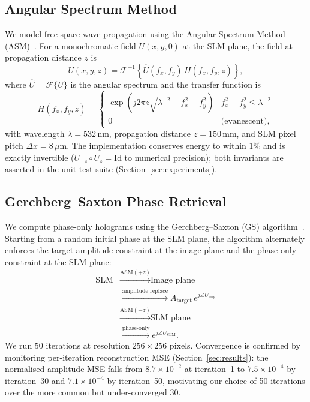 \documentclass[conference]{IEEEtran}
\begin{document}
\subsection{Angular Spectrum Method}
We model free-space wave propagation using the Angular Spectrum Method
(ASM)~\cite{goodman2005introduction}. For a monochromatic field $U(x,y,0)$ at the
SLM plane, the field at propagation distance $z$ is
\begin{equation}
  U(x,y,z) = \mathcal{F}^{-1}\!\left\{
    \hat{U}(f_x, f_y)\, H(f_x, f_y, z)
  \right\},
\end{equation}
where $\hat{U} = \mathcal{F}\{U\}$ is the angular spectrum and the transfer
function is
\begin{equation}
  H(f_x,f_y,z) =
  \begin{cases}
    \exp\!\left(j 2\pi z \sqrt{\lambda^{-2} - f_x^2 - f_y^2}\right) & f_x^2+f_y^2 \le \lambda^{-2}\\
    0 & \text{(evanescent),}
  \end{cases}
\end{equation}
with wavelength $\lambda = 532\,\text{nm}$, propagation distance
$z = 150\,\text{mm}$, and SLM pixel pitch $\Delta x = 8\,\mu\text{m}$. The
implementation conserves energy to within $1\%$ and is exactly invertible
($U_{-z} \circ U_{z} = \mathrm{Id}$ to numerical precision); both invariants are
asserted in the unit-test suite (Section~\ref{sec:experiments}).

\subsection{Gerchberg--Saxton Phase Retrieval}
We compute phase-only holograms using the Gerchberg--Saxton (GS)
algorithm~\cite{gerchberg1972practical}. Starting from a random initial phase at
the SLM plane, the algorithm alternately enforces the target amplitude constraint
at the image plane and the phase-only constraint at the SLM plane:
\begin{align}
  \text{SLM} &\xrightarrow{\text{ASM}(+z)} \text{Image plane} \\
  &\xrightarrow{\text{amplitude replace}} A_{\text{target}}\, e^{j\angle U_{\text{img}}} \\
  &\xrightarrow{\text{ASM}(-z)} \text{SLM plane} \\
  &\xrightarrow{\text{phase-only}} e^{j\angle U_{\text{SLM}}}.
\end{align}
We run $50$ iterations at resolution $256\times256$ pixels. Convergence is
confirmed by monitoring per-iteration reconstruction MSE
(Section~\ref{sec:results}): the normalised-amplitude MSE falls from
$8.7\times10^{-2}$ at iteration~1 to $7.5\times10^{-4}$ by iteration~30 and
$7.1\times10^{-4}$ by iteration~50, motivating our choice of 50 iterations over
the more common but under-converged 30.
\end{document}
